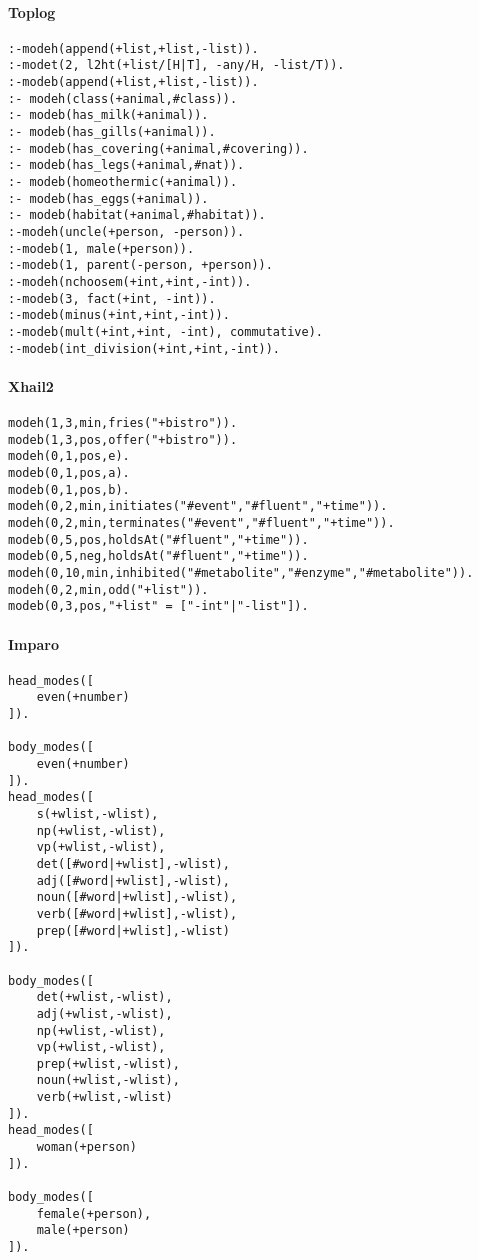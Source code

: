 \paragraph{Toplog}
\begin{lstlisting}
:-modeh(append(+list,+list,-list)).
:-modet(2, l2ht(+list/[H|T], -any/H, -list/T)).
:-modeb(append(+list,+list,-list)).
:- modeh(class(+animal,#class)).
:- modeb(has_milk(+animal)).
:- modeb(has_gills(+animal)).
:- modeb(has_covering(+animal,#covering)).
:- modeb(has_legs(+animal,#nat)).
:- modeb(homeothermic(+animal)).
:- modeb(has_eggs(+animal)).
:- modeb(habitat(+animal,#habitat)).
:-modeh(uncle(+person, -person)).
:-modeb(1, male(+person)).
:-modeb(1, parent(-person, +person)).
:-modeh(nchoosem(+int,+int,-int)).
:-modeb(3, fact(+int, -int)). 
:-modeb(minus(+int,+int,-int)).
:-modeb(mult(+int,+int, -int), commutative).
:-modeb(int_division(+int,+int,-int)).
\end{lstlisting}

\paragraph{Xhail2}
\begin{lstlisting}
modeh(1,3,min,fries("+bistro")).
modeb(1,3,pos,offer("+bistro")).
modeh(0,1,pos,e).
modeb(0,1,pos,a).
modeb(0,1,pos,b).
modeh(0,2,min,initiates("#event","#fluent","+time")).
modeh(0,2,min,terminates("#event","#fluent","+time")).
modeb(0,5,pos,holdsAt("#fluent","+time")).
modeb(0,5,neg,holdsAt("#fluent","+time")).
modeh(0,10,min,inhibited("#metabolite","#enzyme","#metabolite")).
modeh(0,2,min,odd("+list")).
modeb(0,3,pos,"+list" = ["-int"|"-list"]).
\end{lstlisting}

\paragraph{Imparo}
\begin{lstlisting}
head_modes([
    even(+number)
]).

body_modes([
    even(+number)
]).
head_modes([
    s(+wlist,-wlist),
    np(+wlist,-wlist),
    vp(+wlist,-wlist),
    det([#word|+wlist],-wlist),
    adj([#word|+wlist],-wlist),
    noun([#word|+wlist],-wlist),
    verb([#word|+wlist],-wlist),
    prep([#word|+wlist],-wlist)
]).

body_modes([
    det(+wlist,-wlist),
    adj(+wlist,-wlist),
    np(+wlist,-wlist),
    vp(+wlist,-wlist),
    prep(+wlist,-wlist),
    noun(+wlist,-wlist),
    verb(+wlist,-wlist)
]).
head_modes([
    woman(+person)
]).

body_modes([
    female(+person),
    male(+person)
]).
\end{lstlisting}

